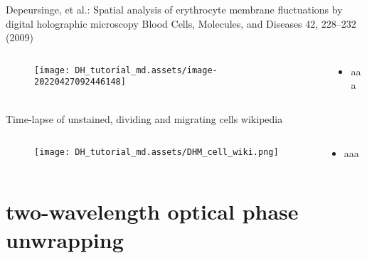 \documentclass[t, aspectratio=169]{beamer}
\begin{document}
\begin{frame}{Depeursinge, et al.: Spatial analysis of erythrocyte membrane fluctuations by digital holographic microscopy}
	\vspace{-3 mm}
	\small Blood Cells, Molecules, and Diseases 42, 228–232 (2009)
	\begin{columns}
		\begin{column}{.6\textwidth}
			\begin{figure}
				\texttt{[image: DH\_tutorial\_md.assets/image-20220427092446148]}
			\end{figure}
		\end{column}
		\begin{column}{.4\textwidth}
			\begin{itemize}
				\item aaa
			\end{itemize}
		\end{column}
	\end{columns}
\end{frame}


\begin{frame}{Time-lapse of unstained, dividing and migrating cells}
	\vspace{-3 mm}
	\small wikipedia
	\begin{columns}
		\begin{column}{.6\textwidth}
			\begin{figure}
				\texttt{[image: DH\_tutorial\_md.assets/DHM\_cell\_wiki.png]}
			\end{figure}
		\end{column}
		\begin{column}{.4\textwidth}
			\begin{itemize}
				\item aaa
			\end{itemize}
		\end{column}
	\end{columns}
\end{frame}


\section{two-wavelength optical phase unwrapping}
\begin{frame}[c]
	\centering\LARGE\textbf{\secname}
\end{frame}
\end{document}
